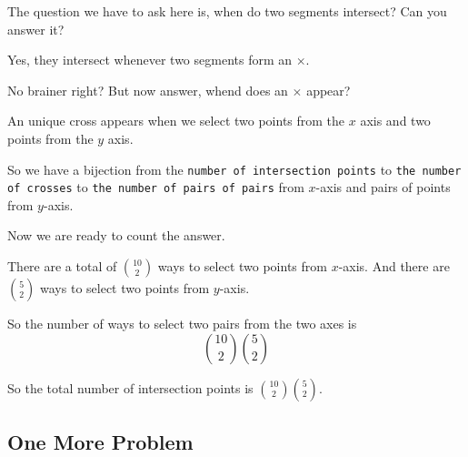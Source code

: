\documentclass[compress]{beamer}
\begin{document}
\begin{frame}
    The question we have to ask here is, when do two segments intersect? Can
    you answer it?

    \pause\vspace{1em}

    Yes, they intersect whenever \textcolor{NordBrightBlue}{two segments form
    an $\times$.} 

    \pause\vspace{1em}

    No brainer right? But now answer, whend does an $\times$ appear?

    \pause\vspace{1em}

    \textcolor{NordBrightBlue}{An unique cross appears when we select two
    points from the $x$ axis and two points from the $y$ axis.}
\end{frame}

\begin{frame}
    So we have a bijection from the \texttt{number of intersection points} to
    \texttt{the number of crosses} to \texttt{the number of pairs of pairs} from 
    \textcolor{NordRed}{$x$-axis and pairs of points from $y$-axis}.

    \pause\vspace{2em}

    Now we are ready to count the answer. 

    \pause\vspace{2em}

    \textcolor{NordRed}{
        There are a total of ${10 \choose 2}$ ways to select two points from
        $x$-axis. And there are ${5 \choose 2}$ ways to select two points from
        $y$-axis.
    }

    \pause\vspace{1em}

    So the number of ways to select two pairs from the two axes is 
    \[\boxed{{10 \choose 2}{5 \choose 2}}\] 
\end{frame}

\begin{frame}
    So the total number of intersection points is ${10 \choose 2}{5 \choose
    2}$.
\end{frame}


\subsection{One More Problem}
\end{document}
